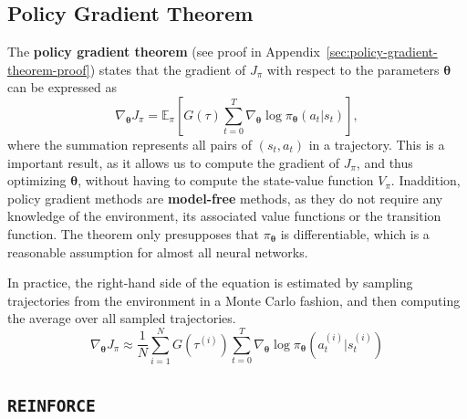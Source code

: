 \documentclass[12pt]{report}
\theoremstyle{definition}
\theoremstyle{remark}
\begin{document}
\subsection{Policy Gradient Theorem}
The \textbf{policy gradient theorem} (see proof in Appendix~\ref{sec:policy-gradient-theorem-proof}) states that the gradient of $J_\pi$ with respect to the parameters $\boldsymbol{\theta}$ can be expressed as
\begin{equation}\label{eq:policy-gradient-theorem}
    \nabla_{\boldsymbol{\theta}} J_\pi =  \mathbb{E}_\pi\left[G(\tau) \sum_{t=0}^{T} \nabla_{\boldsymbol{\theta}} \log \pi_{\boldsymbol{\theta}}(a_t | s_t)\right],
\end{equation}
where the summation represents all pairs of $(s_t, a_t)$ in a trajectory.
This is a important result, as it allows us to compute the gradient of $J_\pi$, and thus optimizing $\boldsymbol{\theta}$, without having to compute the state-value function $V_\pi$. Inaddition, policy gradient methods are \textbf{model-free} methods, as they do not require any knowledge of the environment, its associated value functions or the transition function. The theorem only presupposes that $\pi_{\boldsymbol{\theta}}$ is differentiable, which is a reasonable assumption for almost all neural networks.

In practice, the right-hand side of the equation is estimated by sampling trajectories from the environment in a Monte Carlo fashion, and then computing the average over all sampled trajectories.
\begin{equation}
    \nabla_{\boldsymbol{\theta}} J_\pi \approx \frac{1}{N} \sum_{i=1}^{N} G(\tau^{(i)}) \sum_{t=0}^{T} \nabla_{\boldsymbol{\theta}} \log \pi_{\boldsymbol{\theta}}(a_t^{(i)} | s_t^{(i)})
\end{equation}

\subsection{\texttt{REINFORCE}}
\end{document}

